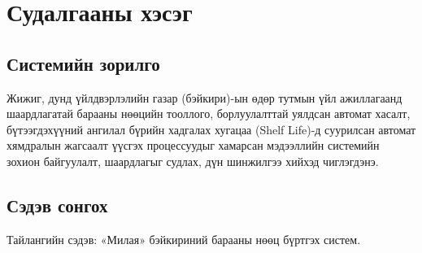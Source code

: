 
\chapter{Судалгааны хэсэг} %
\label{Chapter1} %

\section*{Системийн зорилго}

Жижиг, дунд үйлдвэрлэлийн газар (бэйкири)-ын өдөр тутмын үйл ажиллагаанд шаардлагатай барааны нөөцийн тооллого, борлуулалттай уялдсан автомат хасалт, бүтээгдэхүүний ангилал бүрийн хадгалах хугацаа (Shelf Life)-д суурилсан автомат хямдралын жагсаалт үүсгэх процессуудыг хамарсан мэдээллийн системийн зохион байгуулалт, шаардлагыг судлах, дүн шинжилгээ хийхэд чиглэгдэнэ. 

\section{Сэдэв сонгох}
Тайлангийн сэдэв: «Милая» бэйкириний барааны нөөц бүртгэх систем.

